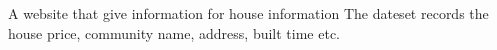 \item[\textbf{Fang Tianxia}$^\dagger$] A website that give information for house information
\subitem The dateset records the house price, community name, address, built time etc.